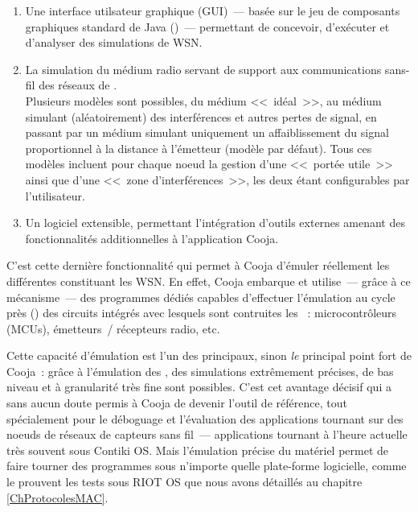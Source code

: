 \begin{enumerate}

\item Une interface utilsateur graphique (GUI)~--- basée sur le jeu de
composants graphiques standard de Java ()~--- permettant
de concevoir, d'exécuter et d'analyser des simulations de WSN.

\item La simulation du médium radio servant de support aux communications
sans-fil des réseaux de . \\
Plusieurs modèles sont possibles, du médium <<~idéal~>>, au médium simulant
(aléatoirement) des interférences et autres pertes de signal, en passant par
un médium simulant uniquement un affaiblissement du signal proportionnel à
la distance à l'émetteur (modèle par défaut). Tous ces modèles incluent pour
chaque noeud la gestion d'une <<~portée utile~>> ainsi que d'une <<~zone
d'interférences~>>, les deux étant configurables par l'utilisateur.

\item Un  logiciel extensible, permettant l'intégration
d'outils externes amenant des fonctionnalités additionnelles à l'application
Cooja.

\end{enumerate}

C'est cette dernière fonctionnalité qui permet à Cooja d'émuler réellement
les différentes  constituant les WSN. En effet, Cooja embarque
et utilise~--- grâce à ce mécanisme~--- des programmes dédiés capables
d'effectuer l'émulation au cycle près ()
des circuits intégrés avec lesquels sont contruites les ~:
microcontrôleurs (MCUs), émetteurs~/ récepteurs radio, etc.

Cette capacité d'émulation est l'un des principaux, sinon \emph{le}
principal point fort de Cooja~: grâce à l'émulation des ,
des simulations extrêmement précises, de bas niveau et à granularité
très fine sont possibles. C'est cet avantage décisif qui a sans aucun
doute permis à Cooja de devenir l'outil de référence, tout spécialement
pour le déboguage et l'évaluation des applications tournant sur des noeuds
de réseaux de capteurs sans fil~--- applications tournant à l'heure actuelle
très souvent sous Contiki OS. Mais l'émulation précise du matériel permet
de faire tourner des programmes sous n'importe quelle plate-forme
logicielle, comme le prouvent les tests sous RIOT OS que nous avons
détaillés au chapitre \ref{ChProtocolesMAC}.

